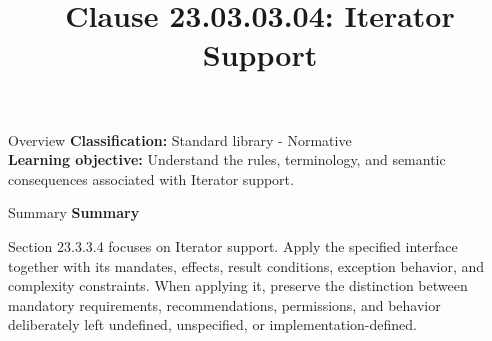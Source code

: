 \documentclass[10pt,letterpaper]{article}
\title{Clause 23.03.03.04: Iterator Support}
\author{}
\date{}
\begin{document}
\maketitle
\begin{CornellOverviewBox}{Overview}
\textbf{Classification:} Standard library - Normative\\[2pt]
\textbf{Learning objective:} Understand the rules, terminology, and semantic consequences associated with Iterator support.
\end{CornellOverviewBox}\begin{CornellSummaryBox}{Summary}
{\sffamily\bfseries\color{Accent} Summary}\par\vspace{3pt}Section 23.3.3.4 focuses on Iterator support. Apply the specified interface together with its mandates, effects, result conditions, exception behavior, and complexity constraints. When applying it, preserve the distinction between mandatory requirements, recommendations, permissions, and behavior deliberately left undefined, unspecified, or implementation-defined.
\end{CornellSummaryBox}
\end{document}
